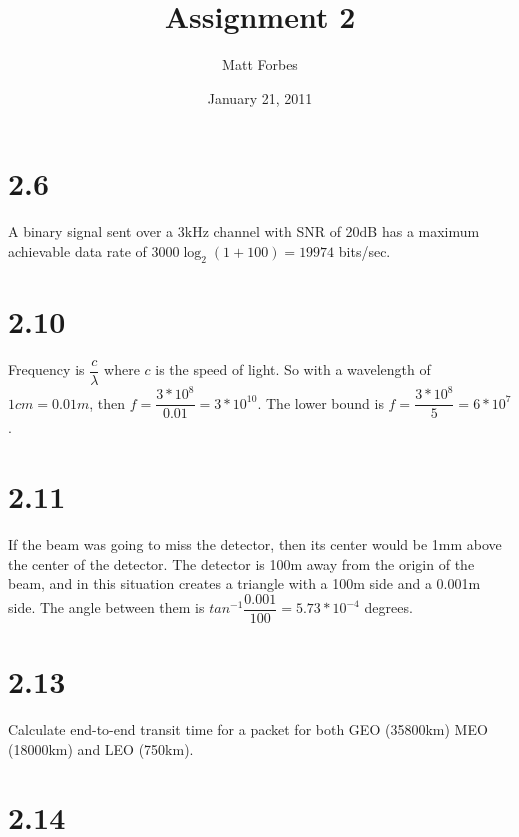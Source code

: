 \documentclass[a4paper,12pt]{article}
\begin{document}
\title{Assignment 2}
\author{Matt Forbes}
\date{January 21, 2011}
\maketitle

\section*{2.6}
A binary signal sent over a 3kHz channel with SNR of 20dB has a
maximum achievable data rate of $3000\log_2(1+100) = 19974$ bits/sec.
\section*{2.10}
Frequency is $\dfrac{c}{\lambda}$ where $c$ is the speed of light. So
with a wavelength of $1cm = 0.01m$, then $f = \dfrac{3*10^8}{0.01} =
3*10^{10}$. The lower bound is $f = \dfrac{3*10^8}{5} = 6*10^7$.
\section*{2.11}
If the beam was going to miss the detector, then its center would be
1mm above the center of the detector. The detector is 100m away from
the origin of the beam, and in this situation creates a triangle with
a 100m side and a 0.001m side. The angle between them is
$tan^{-1}\dfrac{0.001}{100} = 5.73*10^{-4}$ degrees.
\section*{2.13}
Calculate end-to-end transit time for a packet for both GEO (35800km)
MEO (18000km) and LEO (750km).
\section*{2.14}
\end{document}
